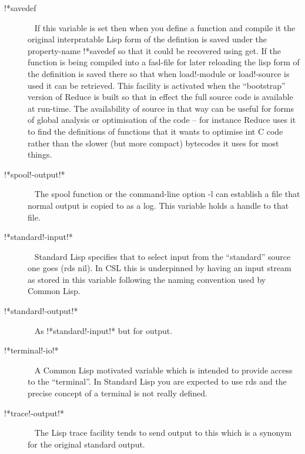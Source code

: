 \documentclass[a4paper,11pt]{article}
\begin{document}
\begin{description}
\item [{\ttfamily !*savedef}]  ~\newline
If this variable is set then when you define a function and compile it the
original interpratable Lisp form of the defintion is saved under the
property-name {\ttfamily !*savedef} so that it could be recovered using
{\ttfamily get}. If the function is being compiled into a fasl-file for
later reloading the lisp form of the definition is saved there so that when
{\ttfamily load!-module} or {\ttfamily load!-source} is used it can be
retrieved. This facility is activated when the ``bootstrap'' version of
Reduce is built so that in effect the full source code is available at
run-time. The availability of source in that way can be useful for forms
of global analysis or optimisation of the code -- for instance Reduce
uses it to find the definitions of functions that it wants to optimise
int C code rather than the slower (but more compact) bytecodes it uses
for most things.

\item [{\ttfamily !*spool!-output!*}]  ~\newline
The {\ttfamily spool} function or the command-line option {\ttfamily -l}
can establish a file that normal output is copied to as a log. This variable
holds a handle to that file.

\item [{\ttfamily !*standard!-input!*}]  ~\newline
Standard Lisp specifies that to select input from the ``standard'' source
one goes {\ttfamily (rds nil)}. In CSL this is underpinned by having an
input stream as stored in this variable following the naming convention used
by Common Lisp.

\item [{\ttfamily !*standard!-output!*}]  ~\newline
As {\ttfamily !*standard!-input!*} but for output.

\item [{\ttfamily !*terminal!-io!*}]  ~\newline
A Common Lisp motivated variable which is intended to provide access to
the ``terminal''. In Standard Lisp you are expected to use {\ttfamily rds}
and the precise concept of a terminal is not really defined.

\item [{\ttfamily !*trace!-output!*}]  ~\newline
The Lisp trace facility tends to send output to this which is a synonym
for the original standard output.


\end{description}
\end{document}
